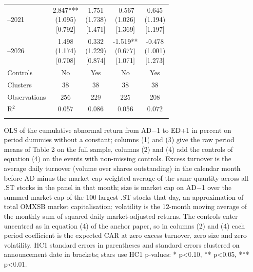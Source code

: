 \begin{threeparttable}
\begin{tabular}{@{}lcccc}
\addlinespace[0.25ex]
\addlinespace[0.25ex]
2017–2021 & \makecell{2.847*** \\ (1.095) \\{}[0.792]} & \makecell{1.751 \\ (1.738) \\{}[1.471]} & \makecell{-0.567 \\ (1.026) \\{}[1.369]} & \makecell{0.645 \\ (1.194) \\{}[1.197]} \\
\addlinespace[0.25ex]
\addlinespace[0.25ex]
2022–2026 & \makecell{1.498 \\ (1.174) \\{}[0.708]} & \makecell{0.332 \\ (1.229) \\{}[0.874]} & \makecell{-1.519** \\ (0.677) \\{}[1.071]} & \makecell{-0.478 \\ (1.001) \\{}[1.273]} \\
\addlinespace[0.25ex]
\midrule
\addlinespace[1ex]
Controls & No & Yes & No & Yes \\
\addlinespace[0.25ex]
\addlinespace[0.25ex]
Clusters & 38 & 38 & 38 & 38 \\
\addlinespace[0.25ex]
\addlinespace[0.25ex]
Observations & 256 & 229 & 225 & 208 \\
\addlinespace[0.25ex]
\addlinespace[0.25ex]
R$^2$ & 0.057 & 0.086 & 0.056 & 0.072 \\
\addlinespace[0.25ex]
\bottomrule
\end{tabular}
\endgroup
\noindent\begin{minipage}{\linewidth}\smallskip\footnotesize
OLS of the cumulative abnormal return from AD$-$1 to ED+1 in percent on period dummies without a constant; columns (1) and (3) give the raw period means of Table 2 on the full sample, columns (2) and (4) add the controls of equation (4) on the events with non-missing controls. Excess turnover is the average daily turnover (volume over shares outstanding) in the calendar month before AD minus the market-cap-weighted average of the same quantity across all .ST stocks in the panel in that month; size is market cap on AD$-$1 over the summed market cap of the 100 largest .ST stocks that day, an approximation of total OMXSB market capitalisation; volatility is the 12-month moving average of the monthly sum of squared daily market-adjusted returns. The controls enter uncentred as in equation (4) of the anchor paper, so in columns (2) and (4) each period coefficient is the expected CAR at zero excess turnover, zero size and zero volatility. HC1 standard errors in parentheses and standard errors clustered on announcement date in brackets; stars use HC1 p-values: * p<0.10, ** p<0.05, *** p<0.01.\end{minipage}

\end{threeparttable}